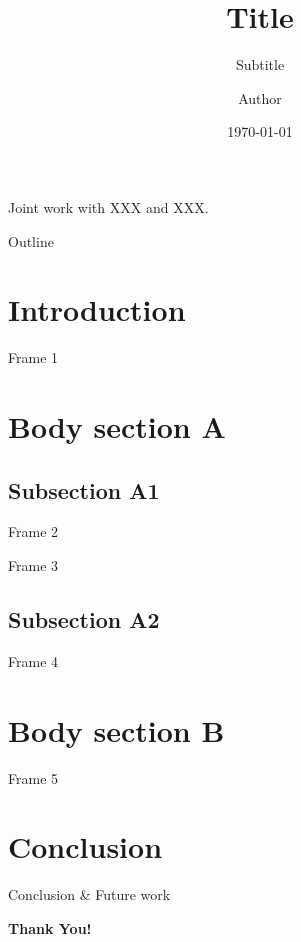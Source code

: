 \documentclass[compress,aspectratio=169]{beamer}
\title{Title}
\subtitle{Subtitle}
\author{Author}
\date{\today}
\institute{University of XXXX}
\begin{document}
\begin{frame}[plain]
    \titlepage

    \begin{center}
        \small Joint work with XXX and XXX.
    \end{center}
\end{frame}

\begin{frame}{Outline}
    \tableofcontents[sectionstyle=show,subsectionstyle=show/shaded/hide,
        subsubsectionstyle=show/shaded/hide]
\end{frame}

\section{Introduction}

\begin{frame}{Frame 1}

\end{frame}

\section{Body section A}

\subsection{Subsection A1}

\begin{frame}{Frame 2}

\end{frame}

\begin{frame}{Frame 3}

\end{frame}

\subsection{Subsection A2}

\begin{frame}{Frame 4}

\end{frame}

\section{Body section B}

\begin{frame}{Frame 5}

\end{frame}

\section{Conclusion}

\begin{frame}{Conclusion \& Future work}

\end{frame}

\begin{frame}[plain]
    \vspace{0.3\textheight}
    \Huge{\centerline{\color{simplebeamercolor}\textbf{Thank You!}}}
\end{frame}
\end{document}
